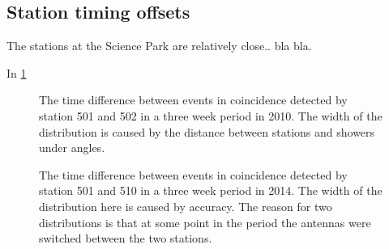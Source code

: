 \subsection{Station timing offsets}

The \hisparc stations at the Science Park are relatively close.. bla bla.


In \cref{fig:station_offsets_501_502}
\begin{figure}
    \centering
    
    \caption{ The
             time difference between events in coincidence detected by
             station 501 and 502 in a three week period in 2010. The
             width of the distribution is caused by the distance between
             stations and showers under angles.}
    \label{fig:station_offsets_501_502}
\end{figure}

\begin{figure}
    \centering
    
    \caption{ The
             time difference between events in coincidence detected by
             station 501 and 510 in a three week period in 2014. The
             width of the distribution here is caused by \gps accuracy.
             The reason for two distributions is that at some point in
             the period the \gps antennas were switched between the two
             stations.}
    \label{fig:station_offsets_501_510}
\end{figure}

